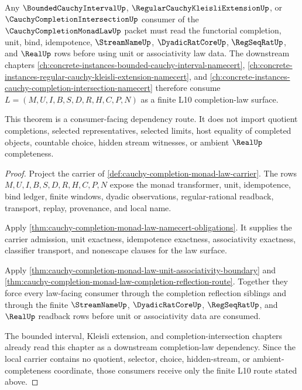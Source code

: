 \begin{theorem}
\label{thm:cauchy-completion-monad-law-l10-forward-consumer}
Any $\BoundedCauchyIntervalUp$, $\RegularCauchyKleisliExtensionUp$, or $\CauchyCompletionIntersectionUp$ consumer of the $\CauchyCompletionMonadLawUp$ packet must read the functorial completion, unit, bind, idempotence, $\StreamNameUp$, $\DyadicRatCoreUp$, $\RegSeqRatUp$, and $\RealUp$ rows before using unit or associativity law data. The downstream chapters \autoref{ch:concrete-instances-bounded-cauchy-interval-namecert}, \autoref{ch:concrete-instances-regular-cauchy-kleisli-extension-namecert}, and \autoref{ch:concrete-instances-cauchy-completion-intersection-namecert} therefore consume $L=(M,U,I,B,S,D,R,H,C,P,N)$ as a finite L10 completion-law surface.

This theorem is a consumer-facing dependency route. It does not import quotient completions, selected representatives, selected limits, host equality of completed objects, countable choice, hidden stream witnesses, or ambient $\RealUp$ completeness.
\end{theorem}
\begin{proof}
Project the carrier of \autoref{def:cauchy-completion-monad-law-carrier}. The rows $M,U,I,B,S,D,R,H,C,P,N$ expose the monad transformer, unit, idempotence, bind ledger, finite windows, dyadic observations, regular-rational readback, transport, replay, provenance, and local name.

Apply \autoref{thm:cauchy-completion-monad-law-namecert-obligations}. It supplies the carrier admission, unit exactness, idempotence exactness, associativity exactness, classifier transport, and nonescape clauses for the law surface.

Apply \autoref{thm:cauchy-completion-monad-law-unit-associativity-boundary} and \autoref{thm:cauchy-completion-monad-law-completion-reflection-route}. Together they force every law-facing consumer through the completion reflection siblings and through the finite $\StreamNameUp$, $\DyadicRatCoreUp$, $\RegSeqRatUp$, and $\RealUp$ readback rows before unit or associativity data are consumed.

The bounded interval, Kleisli extension, and completion-intersection chapters already read this chapter as a downstream completion-law dependency. Since the local carrier contains no quotient, selector, choice, hidden-stream, or ambient-completeness coordinate, those consumers receive only the finite L10 route stated above.
\end{proof}

